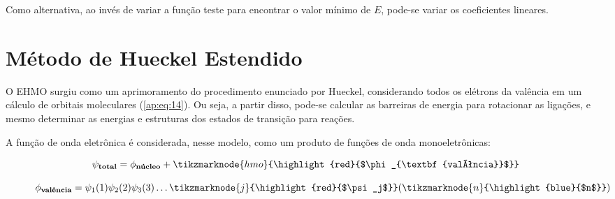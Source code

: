 Como alternativa, ao invés de variar a função teste para encontrar o valor mínimo de $E$, pode-se variar os coeficientes lineares.


\chapter{Método de Hueckel Estendido}

O \gls{EHMO} surgiu como um aprimoramento do procedimento enunciado por Hueckel, considerando todos os elétrons da valência em um cálculo de orbitais moleculares (\autoref{ap:eq:14}). Ou seja, a partir disso, pode-se calcular as barreiras de energia para rotacionar as ligações, e mesmo determinar as energias e estruturas dos estados de transição para reações.

A função de onda eletrônica é considerada, nesse modelo, como um produto de funções de onda monoeletrônicas:

\begin{figure}[htb]
    \vspace{2\baselineskip}
\begin{equation}
    \label{ap:eq:14}
    \psi_{\textbf{total}} = \phi_{\textbf{núcleo}} + \tikzmarknode{hmo}{\highlight{red}{$\phi_{\textbf{valência}}$}}
\end{equation}
\end{figure}

\begin{figure}[htb]
    \vspace{2\baselineskip}
\begin{equation}
    \phi_{\textbf{valência}} = \psi_1 (1) \psi_2 (2) \psi_3 (3) \dots \tikzmarknode{j}{\highlight{red}{$\psi_j$}} (\tikzmarknode{n}{\highlight{blue}{$n$}})
\end{equation}
\end{figure}

